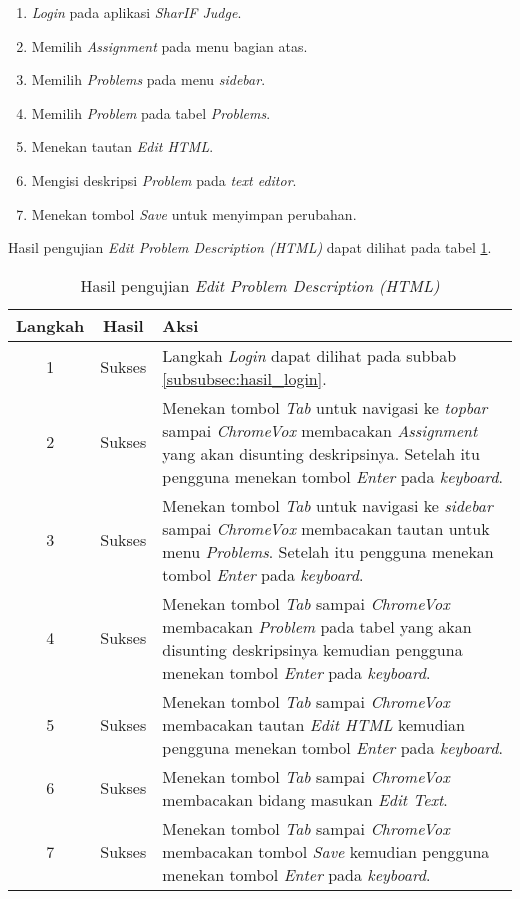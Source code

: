 \begin{enumerate}
	\item \textit{Login} pada aplikasi \textit{SharIF Judge}.
	\item Memilih \textit{Assignment} pada menu bagian atas.
	\item Memilih \textit{Problems} pada menu \textit{sidebar}.
	\item Memilih \textit{Problem} pada tabel \textit{Problems}.
	\item Menekan tautan \textit{Edit HTML}.
	\item Mengisi deskripsi \textit{Problem} pada \textit{text editor}.
	\item Menekan tombol \textit{Save} untuk menyimpan perubahan.
\end{enumerate}

Hasil pengujian \textit{Edit Problem Description (HTML)} dapat dilihat pada tabel \ref{tab:hasil_edit_problem_description_html}.

\begin{table}[H]
	\centering
	\caption{Hasil pengujian \textit{Edit Problem Description (HTML)}}
	\label{tab:hasil_edit_problem_description_html}
	\begin{tabular}{|c|c|p{12cm}|}
		\toprule
		Langkah & Hasil & Aksi\\
		\midrule
		1 & Sukses & Langkah \textit{Login} dapat dilihat pada subbab \ref{subsubsec:hasil_login}.\\
		2 & Sukses & Menekan tombol \textit{Tab} untuk navigasi ke \textit{topbar} sampai \textit{ChromeVox} membacakan \textit{Assignment} yang akan disunting deskripsinya. Setelah itu pengguna menekan tombol \textit{Enter} pada \textit{keyboard}.\\
		3 & Sukses & Menekan tombol \textit{Tab} untuk navigasi ke \textit{sidebar} sampai \textit{ChromeVox} membacakan tautan untuk menu \textit{Problems}. Setelah itu pengguna menekan tombol \textit{Enter} pada \textit{keyboard}.\\
		4 & Sukses & Menekan tombol \textit{Tab} sampai \textit{ChromeVox} membacakan \textit{Problem} pada tabel yang akan disunting deskripsinya kemudian pengguna menekan tombol \textit{Enter} pada \textit{keyboard}.\\
		5 & Sukses & Menekan tombol \textit{Tab} sampai \textit{ChromeVox} membacakan tautan \textit{Edit HTML} kemudian pengguna menekan tombol \textit{Enter} pada \textit{keyboard}.\\
		6 & Sukses & Menekan tombol \textit{Tab} sampai \textit{ChromeVox} membacakan bidang masukan \textit{Edit Text}.\\
		7 & Sukses & Menekan tombol \textit{Tab} sampai \textit{ChromeVox} membacakan tombol \textit{Save} kemudian pengguna menekan tombol \textit{Enter} pada \textit{keyboard}.\\
		\bottomrule
	\end{tabular}
\end{table}

